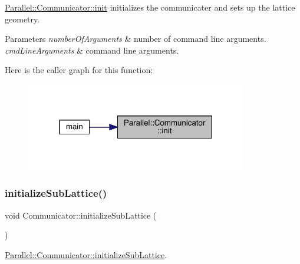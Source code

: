 \mbox{\hyperlink{class_parallel_1_1_communicator_a4ed2a77c33cd899b31131e44fc906fd7}{Parallel\+::\+Communicator\+::init}} initializes the communicater and sets up the lattice geometry. 


\begin{DoxyParams}{Parameters}
{\em number\+Of\+Arguments} & number of command line arguments. \\
\hline
{\em cmd\+Line\+Arguments} & command line arguments. \\
\hline
\end{DoxyParams}
Here is the caller graph for this function\+:\nopagebreak
\begin{figure}[H]
\begin{center}
\leavevmode
\includegraphics[width=274pt]{class_parallel_1_1_communicator_a4ed2a77c33cd899b31131e44fc906fd7_icgraph}
\end{center}
\end{figure}
\mbox{\label{class_parallel_1_1_communicator_a3094d713d09225738ecf0250019db115}} 
\subsubsection{\texorpdfstring{initializeSubLattice()}{initializeSubLattice()}}
{\footnotesize\ttfamily void Communicator\+::initialize\+Sub\+Lattice (\begin{DoxyParamCaption}{ }\end{DoxyParamCaption})\hspace{0.3cm}{\ttfamily [static]}}



\mbox{\hyperlink{class_parallel_1_1_communicator_a3094d713d09225738ecf0250019db115}{Parallel\+::\+Communicator\+::initialize\+Sub\+Lattice}}. 

